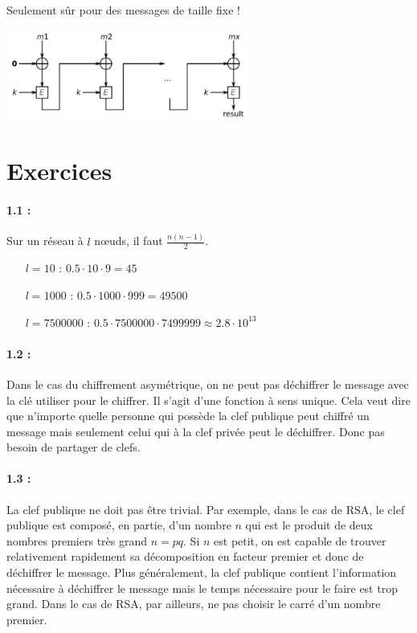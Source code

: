 \documentclass[11pt,a4paper]{report}
\begin{document}
Seulement sûr pour des messages de taille fixe !

\begin{center}
    \includegraphics[width=0.6\textwidth]{img/cbc_mac.png}
\end{center}

\section{Exercices}

\paragraph*{1.1 : } Sur un réseau à $l$ nœuds, il faut $\frac{n(n-1)}{2}$.
\begin{itemize}
    \item[$l=10$      :] $0.5\cdot10\cdot9=45$  
    \item[$l=1000$    :] $0.5\cdot1000\cdot999=49500$
    \item[$l=7500000$ :] $0.5\cdot7500000\cdot7499999\approx2.8\cdot10^{13}$
\end{itemize}

\paragraph*{1.2 : } Dans le cas du chiffrement asymétrique, on ne peut pas déchiffrer le message avec la clé utiliser pour le chiffrer. Il s'agit d'une fonction à sens unique. Cela veut dire que n'importe quelle personne qui possède la clef publique peut chiffré un message mais seulement celui qui à la clef privée peut le déchiffrer. Donc pas besoin de partager de clefs.

\paragraph*{1.3 : } La clef publique ne doit pas être trivial. Par exemple, dans le cas de RSA, le clef publique est composé, en partie, d'un nombre $n$ qui est le produit de deux nombres premiers très grand $n = pq$. Si $n$ est petit, on est capable de trouver relativement rapidement sa décomposition en facteur premier et donc de déchiffrer le message.  Plus généralement, la clef publique contient l'information nécessaire à déchiffrer le message mais le temps nécessaire pour le faire est trop grand. Dans le cas de RSA, par ailleurs, ne pas choisir le carré d'un nombre premier.
\end{document}
